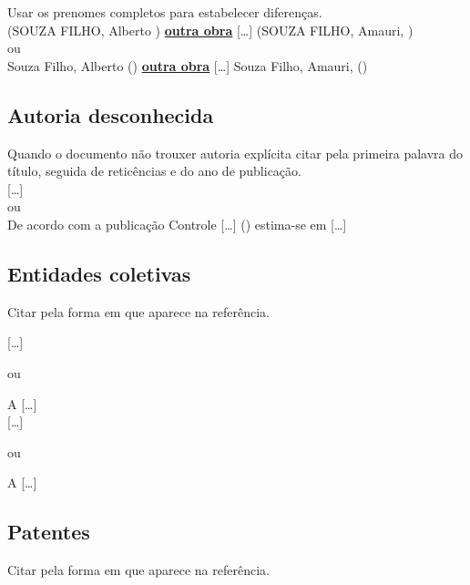 Usar os prenomes completos para estabelecer diferenças. \\

 (SOUZA FILHO, Alberto \citeyear{Souza2015}) \textbf{\underline{outra obra}}   [\ldots] (SOUZA FILHO, Amauri, \citeyear{Souza2015}) \\


ou\\


Souza Filho, Alberto (\citeyear{Souza2015}) \textbf{\underline{outra obra}}   [\ldots] Souza Filho, Amauri, (\citeyear{Souza2015}) \\


\subsection{Autoria desconhecida}

Quando o documento não trouxer autoria explícita citar pela primeira palavra do título, seguida de retic\^encias e do ano de publicação.\\

[\ldots] \cite{Controle2015}\\

ou \\

De acordo com a publicação Controle [\ldots] (\citeyear{Controle2015}) estima-se em [\ldots]\\


\subsection{Entidades coletivas}

Citar pela forma em que aparece na refer\^encia.\\
\newpage

[\ldots] \cite{Sergipe2010}

ou 

A  [\ldots] \\


[\ldots] \cite{Food2005}

ou 

A  [\ldots] \\


\subsection{Patentes}

Citar pela forma em que aparece na refer\^encia.\\

